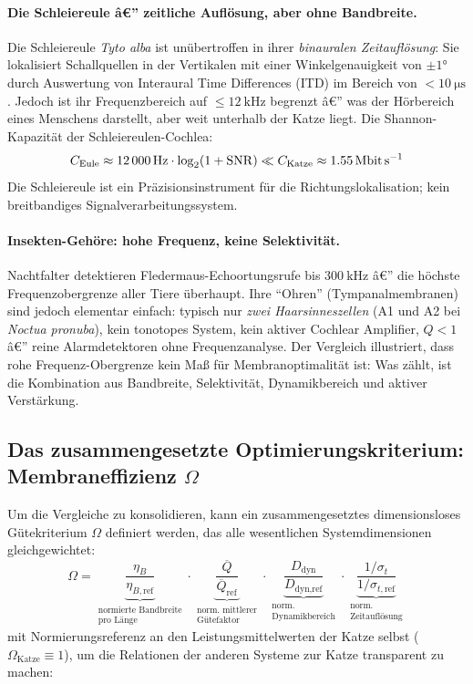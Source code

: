 ﻿\documentclass[12pt,a4paper,titlepage]{report}
\begin{document}
\paragraph{Die Schleiereule â€” zeitliche Auflösung, aber ohne Bandbreite.}
Die Schleiereule \textit{Tyto alba} ist unübertroffen in ihrer \emph{binauralen
Zeitauflösung}: Sie lokalisiert Schallquellen in der Vertikalen mit einer
Winkelgenauigkeit von $\pm 1 °$ durch Auswertung von Interaural Time Differences
(ITD) im Bereich von $< \SI{10}{\micro\second}$.
Jedoch ist ihr Frequenzbereich auf $\leq \SI{12}{\kilo\hertz}$ begrenzt â€”
was der Hörbereich eines Menschens darstellt, aber weit unterhalb der Katze liegt.
Die Shannon-Kapazität der Schleiereulen-Cochlea:
\[
  C_{\text{Eule}} \approx \SI{12000}{\hertz}\cdot\log_2(1 + \mathrm{SNR})
  \ll C_{\text{Katze}} \approx \SI{1{,}55}{\mega\bit\per\second}
\]
Die Schleiereule ist ein Präzisionsinstrument für die Richtungslokalisation;
kein breitbandiges Signalverarbeitungssystem.

\paragraph{Insekten-Gehöre: hohe Frequenz, keine Selektivität.}
Nachtfalter detektieren Fledermaus-Echoortungsrufe bis $\SI{300}{\kilo\hertz}$ â€”
die höchste Frequenzobergrenze aller Tiere überhaupt.
Ihre ``Ohren'' (Tympanalmembranen) sind jedoch elementar einfach:
typisch nur \emph{zwei Haarsinneszellen} (A1 und A2 bei
\textit{Noctua pronuba}), kein tonotopes System, kein aktiver Cochlear Amplifier,
$Q < 1$ â€” reine Alarmdetektoren ohne Frequenzanalyse.
Der Vergleich illustriert, dass rohe Frequenz-Obergrenze kein Maß für
Membranoptimalität ist: Was zählt, ist die Kombination aus Bandbreite,
Selektivität, Dynamikbereich und aktiver Verstärkung.

\subsection{Das zusammengesetzte Optimierungskriterium: Membraneffizienz $\Omega$}

Um die Vergleiche zu konsolidieren, kann ein zusammengesetztes dimensionsloses
Gütekriterium $\Omega$ definiert werden, das alle wesentlichen
Systemdimensionen gleichgewichtet:
\[
  \Omega = \underbrace{\frac{\eta_B}{\eta_{B,\text{ref}}}}_{\substack{\text{normierte Bandbreite}\\\text{pro Länge}}}
  \cdot
  \underbrace{\frac{\overline{Q}}{\overline{Q}_{\text{ref}}}}_{\substack{\text{norm.\ mittlerer}\\\text{Gütefaktor}}}
  \cdot
  \underbrace{\frac{D_{\text{dyn}}}{D_{\text{dyn,ref}}}}_{\substack{\text{norm.}\\\text{Dynamikbereich}}}
  \cdot
  \underbrace{\frac{1/\sigma_t}{1/\sigma_{t,\text{ref}}}}_{\substack{\text{norm.}\\\text{Zeitauflösung}}}
\]
mit Normierungsreferenz an den Leistungsmittelwerten der Katze selbst
($\Omega_{\text{Katze}} \equiv 1$), um die Relationen der anderen Systeme
zur Katze transparent zu machen:
\end{document}
